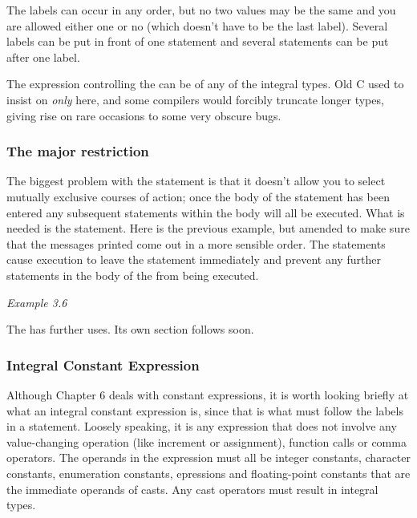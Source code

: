    The labels can occur in any order, but no two values may be the same and
    you are allowed either one or no  (which doesn't have
    to be the last label). Several labels can be put in front of one statement
    and several statements can be put after one label.


   The expression controlling the \switch{} can be of any of the
    integral types. Old C used to insist on \textit{only}
    \kint{} here, and some compilers would forcibly truncate longer
    types, giving rise on rare occasions to some very obscure bugs.


   \subsubsection{The major restriction}
    

    The biggest problem with the \switch{} statement is that it
     doesn't allow you to select mutually exclusive courses of action; once
     the body of the statement has been entered any subsequent statements
     within the body will all be executed. What is needed is the
     \kbreak{} statement. Here is the previous example, but amended
     to make sure that the messages printed come out in a more sensible order.
     The \kbreak{} statements cause execution to leave the
     \switch{} statement immediately and prevent any further
     statements in the body of the \switch{} from being
     executed.


    \begin{center}\textit{Example 3.6}\end{center}


    The \kbreak{} has further uses. Its own section follows
     soon.


   

   \subsubsection{Integral Constant Expression}
    

    Although Chapter 6 deals with constant expressions, it is
     worth looking briefly at what an integral constant expression is, since
     that is what must follow the \case{} labels in a
     \switch{} statement. Loosely speaking, it is any expression
     that does not involve any value-changing operation (like increment or
     assignment), function calls or comma operators. The operands in the
     expression must all be integer constants, character constants,
     enumeration constants, \sizeof{} epressions and floating-point
     constants that are the immediate operands of casts. Any cast operators
     must result in integral types.


